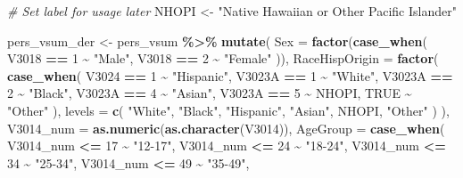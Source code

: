 \documentclass[
]{krantz}
\makeatletter
\newenvironment{Shaded}{\begin{snugshade}}{\end{snugshade}}
\newcommand{\AttributeTok}[1]{\textcolor[rgb]{0.27,0.27,0.27}{#1}}
\newcommand{\CommentTok}[1]{\textcolor[rgb]{0.37,0.37,0.37}{\textit{#1}}}
\newcommand{\ConstantTok}[1]{\textcolor[rgb]{0.37,0.37,0.37}{#1}}
\newcommand{\DecValTok}[1]{\textcolor[rgb]{0.06,0.06,0.06}{#1}}
\newcommand{\FunctionTok}[1]{\textcolor[rgb]{0.27,0.27,0.27}{\textbf{#1}}}
\newcommand{\NormalTok}[1]{#1}
\newcommand{\OtherTok}[1]{\textcolor[rgb]{0.37,0.37,0.37}{#1}}
\newcommand{\SpecialCharTok}[1]{\textcolor[rgb]{0.43,0.43,0.43}{\textbf{#1}}}
\newcommand{\StringTok}[1]{\textcolor[rgb]{0.5,0.5,0.5}{#1}}
\newenvironment{kframe}{%
\medskip{}
\setlength{\fboxsep}{.8em}
 \def\at@end@of@kframe{}%
 \ifinner\ifhmode%
  \def\at@end@of@kframe{\end{minipage}}%
  \begin{minipage}{\columnwidth}%
 \fi\fi%
 \def\FrameCommand##1{\hskip\@totalleftmargin \hskip-\fboxsep
 \colorbox{shadecolor}{##1}\hskip-\fboxsep
     \hskip-\linewidth \hskip-\@totalleftmargin \hskip\columnwidth}%
 \MakeFramed {\advance\hsize-\width
   \@totalleftmargin\z@ \linewidth\hsize
   \@setminipage}}%
 {\par\unskip\endMakeFramed%
 \at@end@of@kframe}
\renewenvironment{Shaded}{\begin{kframe}}{\end{kframe}}
\makeatother
\begin{document}
\begin{Shaded}
\begin{Highlighting}[]
\CommentTok{\# Set label for usage later}
\NormalTok{NHOPI }\OtherTok{\textless{}{-}} \StringTok{"Native Hawaiian or Other Pacific Islander"}

\NormalTok{pers\_vsum\_der }\OtherTok{\textless{}{-}}\NormalTok{ pers\_vsum }\SpecialCharTok{\%\textgreater{}\%}
  \FunctionTok{mutate}\NormalTok{(}
    \AttributeTok{Sex =} \FunctionTok{factor}\NormalTok{(}\FunctionTok{case\_when}\NormalTok{(}
\NormalTok{      V3018 }\SpecialCharTok{==} \DecValTok{1} \SpecialCharTok{\textasciitilde{}} \StringTok{"Male"}\NormalTok{,}
\NormalTok{      V3018 }\SpecialCharTok{==} \DecValTok{2} \SpecialCharTok{\textasciitilde{}} \StringTok{"Female"}
\NormalTok{    )),}
    \AttributeTok{RaceHispOrigin =} \FunctionTok{factor}\NormalTok{(}
      \FunctionTok{case\_when}\NormalTok{(}
\NormalTok{        V3024 }\SpecialCharTok{==} \DecValTok{1} \SpecialCharTok{\textasciitilde{}} \StringTok{"Hispanic"}\NormalTok{,}
\NormalTok{        V3023A }\SpecialCharTok{==} \DecValTok{1} \SpecialCharTok{\textasciitilde{}} \StringTok{"White"}\NormalTok{,}
\NormalTok{        V3023A }\SpecialCharTok{==} \DecValTok{2} \SpecialCharTok{\textasciitilde{}} \StringTok{"Black"}\NormalTok{,}
\NormalTok{        V3023A }\SpecialCharTok{==} \DecValTok{4} \SpecialCharTok{\textasciitilde{}} \StringTok{"Asian"}\NormalTok{,}
\NormalTok{        V3023A }\SpecialCharTok{==} \DecValTok{5} \SpecialCharTok{\textasciitilde{}}\NormalTok{ NHOPI,}
        \ConstantTok{TRUE} \SpecialCharTok{\textasciitilde{}} \StringTok{"Other"}
\NormalTok{      ),}
      \AttributeTok{levels =} \FunctionTok{c}\NormalTok{(}
        \StringTok{"White"}\NormalTok{, }\StringTok{"Black"}\NormalTok{, }\StringTok{"Hispanic"}\NormalTok{,}
        \StringTok{"Asian"}\NormalTok{, NHOPI, }\StringTok{"Other"}
\NormalTok{      )}
\NormalTok{    ),}
    \AttributeTok{V3014\_num =} \FunctionTok{as.numeric}\NormalTok{(}\FunctionTok{as.character}\NormalTok{(V3014)),}
    \AttributeTok{AgeGroup =} \FunctionTok{case\_when}\NormalTok{(}
\NormalTok{      V3014\_num }\SpecialCharTok{\textless{}=} \DecValTok{17} \SpecialCharTok{\textasciitilde{}} \StringTok{"12{-}17"}\NormalTok{,}
\NormalTok{      V3014\_num }\SpecialCharTok{\textless{}=} \DecValTok{24} \SpecialCharTok{\textasciitilde{}} \StringTok{"18{-}24"}\NormalTok{,}
\NormalTok{      V3014\_num }\SpecialCharTok{\textless{}=} \DecValTok{34} \SpecialCharTok{\textasciitilde{}} \StringTok{"25{-}34"}\NormalTok{,}
\NormalTok{      V3014\_num }\SpecialCharTok{\textless{}=} \DecValTok{49} \SpecialCharTok{\textasciitilde{}} \StringTok{"35{-}49"}\NormalTok{,}

\end{Highlighting}
\end{Shaded}
\end{document}
